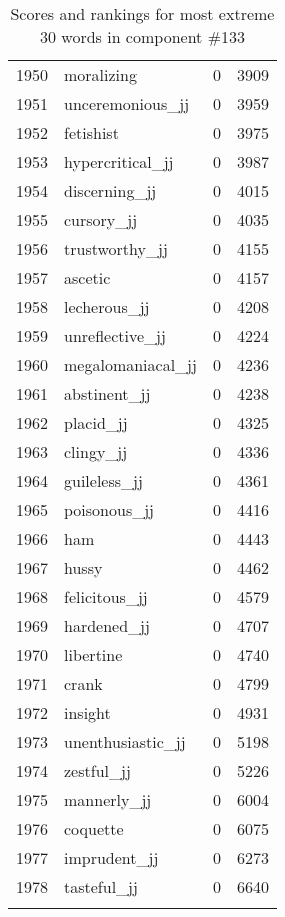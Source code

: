 \begin{longtable}[!htbp]{| rlr@{.}l |}
    1950 & moralizing & 0 & 3909 \\
    1951 & unceremonious\_jj & 0 & 3959 \\
    1952 & fetishist & 0 & 3975 \\
    1953 & hypercritical\_jj & 0 & 3987 \\
    1954 & discerning\_jj & 0 & 4015 \\
    1955 & cursory\_jj & 0 & 4035 \\
    1956 & trustworthy\_jj & 0 & 4155 \\
    1957 & ascetic & 0 & 4157 \\
    1958 & lecherous\_jj & 0 & 4208 \\
    1959 & unreflective\_jj & 0 & 4224 \\
    1960 & megalomaniacal\_jj & 0 & 4236 \\
    1961 & abstinent\_jj & 0 & 4238 \\
    1962 & placid\_jj & 0 & 4325 \\
    1963 & clingy\_jj & 0 & 4336 \\
    1964 & guileless\_jj & 0 & 4361 \\
    1965 & poisonous\_jj & 0 & 4416 \\
    1966 & ham & 0 & 4443 \\
    1967 & hussy & 0 & 4462 \\
    1968 & felicitous\_jj & 0 & 4579 \\
    1969 & hardened\_jj & 0 & 4707 \\
    1970 & libertine & 0 & 4740 \\
    1971 & crank & 0 & 4799 \\
    1972 & insight & 0 & 4931 \\
    1973 & unenthusiastic\_jj & 0 & 5198 \\
    1974 & zestful\_jj & 0 & 5226 \\
    1975 & mannerly\_jj & 0 & 6004 \\
    1976 & coquette & 0 & 6075 \\
    1977 & imprudent\_jj & 0 & 6273 \\
    1978 & tasteful\_jj & 0 & 6640 \\
    \hline
    \caption{Scores and rankings for most extreme 30 words in component \#133} \\
\end{longtable}
